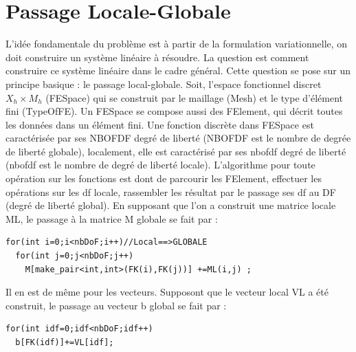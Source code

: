 \documentclass{book}
\begin{document}
\section{Passage Locale-Globale}
L'idée fondamentale du problème est à partir de la formulation variationnelle, on doit construire un système linéaire à résoudre. La question est comment construire ce système linéaire dans le cadre général. Cette question se pose sur un principe basique : le passage local-globale. Soit, l'espace fonctionnel discret $X_h \times M_h$ (FESpace) qui se construit par le maillage (Mesh) et le type d'élément fini (TypeOfFE). Un FESpace se compose aussi des FElement, qui décrit toutes les données dans un élément fini. Une fonction discrète dans FESpace est caractérisée par ses NBOFDF degré de liberté (NBOFDF est le nombre de degrée de liberté globale), localement, elle est caractérisé par ses nbofdf degré de liberté (nbofdf est le nombre de degré de liberté locale). L'algorithme pour toute opération sur les fonctions est dont de parcourir les FElement, effectuer les opérations sur les df locale, rassembler les résultat par le passage ses df au DF (degré de liberté global). En supposant que l'on a construit une matrice locale ML, le passage à la matrice M globale se fait par :
\begin{lstlisting}
for(int i=0;i<nbDoF;i++)//Local==>GLOBALE 
  for(int j=0;j<nbDoF;j++) 
    M[make_pair<int,int>(FK(i),FK(j))] +=ML(i,j) ; 
\end{lstlisting}
Il en est de même pour les vecteurs. Supposont que le vecteur local VL a été construit, le passage au vecteur b global se fait par :
\begin{lstlisting}
for(int idf=0;idf<nbDoF;idf++) 
  b[FK(idf)]+=VL[idf];
\end{lstlisting}

\end{document}

